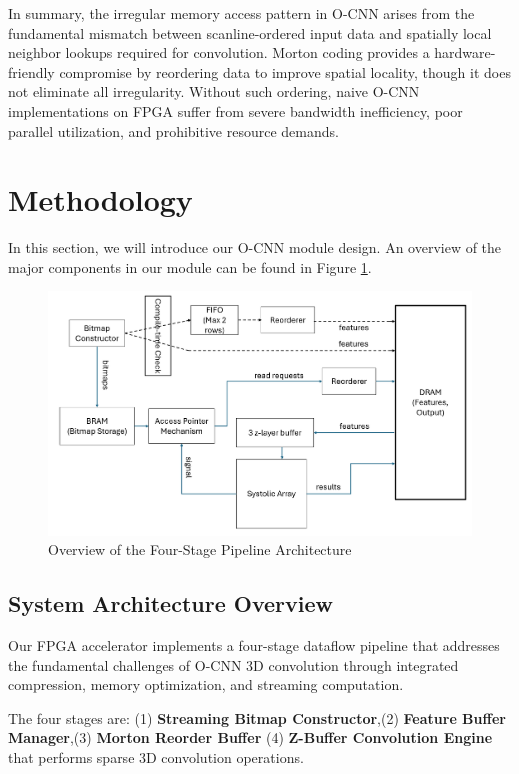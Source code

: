 \documentclass[sigconf, screen]{acmart}
\begin{document}
In summary, the irregular memory access pattern in O-CNN arises from the fundamental mismatch between scanline-ordered input data and spatially local neighbor lookups required for convolution. Morton coding provides a hardware-friendly compromise by reordering data to improve spatial locality, though it does not eliminate all irregularity. Without such ordering, naive O-CNN implementations on FPGA suffer from severe bandwidth inefficiency, poor parallel utilization, and prohibitive resource demands.
\section{Methodology}
In this section, we will introduce our O-CNN module design. An overview of the major components in our module can be found in Figure \ref{fig:architecture}.

\begin{figure}[H]
    \centering
    \includegraphics[width=1\linewidth]{overview-architecture.png}
    \caption{Overview of the Four-Stage Pipeline Architecture}
    \label{fig:architecture}
\end{figure}

\subsection{System Architecture Overview}

Our FPGA accelerator implements a four-stage dataflow pipeline that addresses the fundamental challenges of O-CNN 3D convolution through integrated compression, memory optimization, and streaming computation.

The four stages are: (1) \textbf{Streaming Bitmap Constructor},(2) \textbf{Feature Buffer Manager},(3) \textbf{Morton Reorder Buffer} (4) \textbf{Z-Buffer Convolution Engine} that performs sparse 3D convolution operations.
\end{document}
